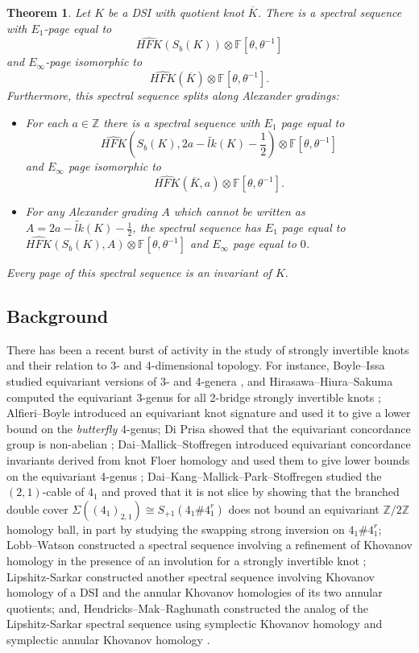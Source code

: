 \documentclass[11pt]{amsart}
\newtheorem{theorem}{Theorem}[section]
\theoremstyle{definition}
\theoremstyle{remark}
\def\F{\mathbb{F}}
\def\Z{\mathbb{Z}}
\def\HFK {\mathit{HFK}}
\newcommand\HFKhat{\widehat{\HFK}}
\numberwithin{equation}{section}
\begin{document}
\begin{theorem}\label{Mainthm2}
    Let $K$ be a DSI with quotient knot $\overline{K}$. There is a spectral sequence with $E_1$-page equal to
    \[\HFKhat(S_b(K))\otimes \F[\theta,\theta^{-1}]\] and $E_{\infty}$-page isomorphic to  \[\HFKhat(\overline{K})\otimes \F[\theta,\theta^{-1}].\] Furthermore, this spectral sequence splits along Alexander gradings:
    \begin{itemize}
        \item For each $a\in \Z$ there is a spectral sequence with $E_1$ page equal to \[\HFKhat(S_b(K), 2a-\widetilde{lk}(K)-\frac{1}{2})\otimes \F[\theta,\theta^{-1}]\] and $E_{\infty}$ page isomorphic to \[\HFKhat(\overline{K}, a)\otimes \F[\theta,\theta^{-1}].\]
        \item For any Alexander grading $A$ which cannot be written as $A=2a-\widetilde{lk}(K)-\frac{1}{2}$, the spectral sequence has $E_1$ page equal to $\HFKhat(S_b(K), A)\otimes \F[\theta,\theta^{-1}]$ and $E_\infty$ page equal to $0$.
    \end{itemize} 
    Every page of this spectral sequence is an invariant of $K.$
\end{theorem}


\subsection{Background}\label{background}
 There has been a recent burst of activity in the study of strongly invertible knots and their relation to 3- and 4-dimensional topology. For instance, Boyle--Issa studied equivariant versions of 3- and 4-genera \cite{BoyAhE4G}, and Hirasawa--Hiura--Sakuma computed the equivariant 3-genus for all 2-bridge strongly invertible knots \cite{HirasawaHiuraSakuma2023}; Alfieri--Boyle introduced an equivariant knot signature \cite{alfieri2021strongly} and used it to give a lower bound on the \emph{butterfly} 4-genus;  Di Prisa showed that the equivariant concordance group is non-abelian \cite{diprisa2022equivariant}; Dai--Mallick--Stoffregen introduced equivariant concordance invariants derived from knot Floer homology and used them to give lower bounds on the equivariant 4-genus \cite{DMSE}; Dai--Kang--Mallick--Park--Stoffregen studied the $(2,1)$-cable of $4_1$ and proved that it is not slice by showing that the branched double cover $\Sigma((4_1)_{2,1})\cong S_{+1}(4_1\#4_1^r)$ does not bound an equivariant $\Z/2\Z$ homology ball, in part by studying the swapping strong inversion on $4_1\#4_1^r$; Lobb--Watson constructed a spectral sequence involving a refinement of Khovanov homology in the presence of an involution for a strongly invertible knot \cite{Lobb_2021}; Lipshitz-Sarkar constructed another spectral sequence involving Khovanov homology of a DSI and the annular Khovanov homologies of its two annular quotients; and, Hendricks--Mak--Raghunath constructed the analog of the Lipshitz-Sarkar spectral sequence using symplectic Khovanov homology and symplectic annular Khovanov homology \cite{hendricks2024symplecticannularkhovanovhomology}.
\end{document}
